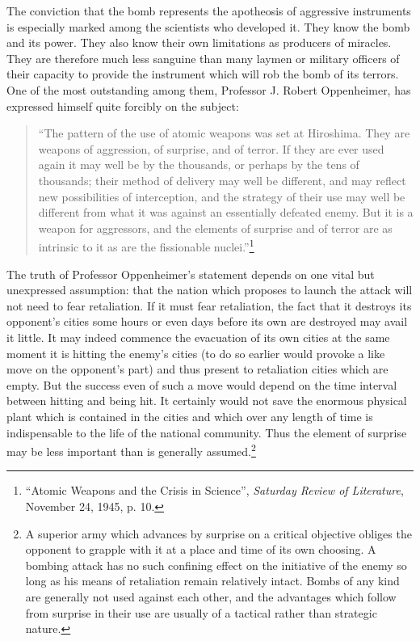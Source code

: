 The conviction that the bomb represents the apotheosis of aggressive instruments is especially marked among the scientists who developed it. They know the bomb and its power. They also know their own limitations as producers of miracles. They are therefore much less sanguine than many laymen or military officers of their capacity to provide the instrument which will rob the bomb of its terrors. One of the most outstanding among them, Professor J. Robert Oppenheimer, has expressed himself quite forcibly on the subject:

\begin{quote}
``The pattern of the use of atomic weapons was set at Hiroshima. They are weapons of aggression, of surprise, and of terror. If they are ever used again it may well be by the thousands, or perhaps by the tens of thousands; their method of delivery may well be different, and may reflect new possibilities of interception, and the strategy of their use may well be different from what it was against an essentially defeated enemy. But it is a weapon for aggressors, and the elements of surprise and of terror are as intrinsic to it as are the fissionable nuclei.''\footnote{``Atomic Weapons and the Crisis in Science'', \textit{Saturday Review of Literature}, November 24, 1945, p. 10.}
\end{quote}

The truth of Professor Oppenheimer's statement depends on one vital but unexpressed assumption: that the nation which proposes to launch the attack will not need to fear retaliation. If it must fear retaliation, the fact that it destroys its opponent's cities some hours or even days before its own are destroyed may avail it little. It may indeed commence the evacuation of its own cities at the same moment it is hitting the enemy's cities (to do so earlier would provoke a like move on the opponent's part) and thus present to retaliation cities which are empty. But the success even of such a move would depend on the time interval between hitting and being hit. It certainly would not save the enormous physical plant which is contained in the cities and which over any length of time is indispensable to the life of the national community. Thus the element of surprise may be less important than is generally assumed.\footnote{A superior army which advances by surprise on a critical objective obliges the opponent to grapple with it at a place and time of its own choosing. A bombing attack has no such confining effect on the initiative of the enemy so long as his means of retaliation remain relatively intact. Bombs of any kind are generally not used against each other, and the advantages which follow from surprise in their use are usually of a tactical rather than strategic nature.}

